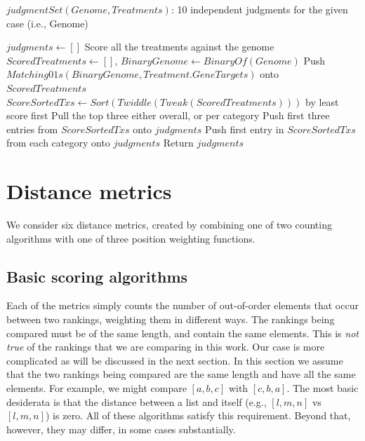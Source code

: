 \documentclass{article}
\begin{document}
\begin{algorithm}
	\caption{$judgmentSet(Genome,Treatments)$: 10 independent judgments for the given case (i.e., Genome)}
	\begin{algorithmic}[1]
		\State $judgments \leftarrow []$
		\State Score all the treatments against the genome
		\State $ScoredTreatments \leftarrow []$, $BinaryGenome  \leftarrow BinaryOf(Genome)$
		    \State Push $Matching01s(BinaryGenome,Treatment.GeneTargets)$ onto $ScoredTreatments$  
		\EndFor
		    \State $ScoreSortedTxs \leftarrow Sort(Twiddle(Tweak(ScoredTreatments)))$ by least score first
		    \State Pull the top three either overall, or per category
		        \State Push first three entries from $ScoreSortedTxs$ onto $judgments$
		    \Else
		        \State Push first entry in $ScoreSortedTxs$ from each category onto $judgments$
		    \EndIf
		\EndFor
		\State Return $judgments$
	\end{algorithmic} 
\end{algorithm} 

\section{Distance metrics}

We consider six distance metrics, created by combining one of two counting algorithms with one of three position weighting functions.  

\subsection{Basic scoring algorithms}

Each of the metrics simply counts the number of out-of-order elements that occur between two rankings, weighting them in different ways. The rankings being compared must be of the same length, and contain the same elements. This is \textit{not true} of the rankings that we are comparing in this work. Our case is more complicated as will be discussed in the next section. In this section we assume that the two rankings being compared are the same length and have all the same elements. For example, we might compare $[a,b,c]$ with $[c,b,a]$. The most basic desiderata is that the distance between a list and itself (e.g., $[l,m,n]$ vs $[l,m,n]$) is zero. All of these algorithms satisfy this requirement. Beyond that, however, they may differ, in some cases substantially.
\end{document}
